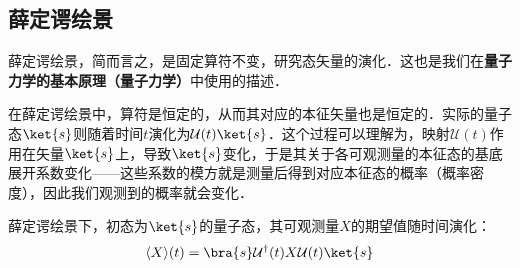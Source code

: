 

\subsection{薛定谔绘景}

薛定谔绘景，简而言之，是固定算符不变，研究态矢量的演化．这也是我们在\textbf{量子力学的基本原理（量子力学）}中使用的描述．

在薛定谔绘景中，算符是恒定的，从而其对应的本征矢量也是恒定的．实际的量子态$\ket{s}$则随着时间$t$演化为$\mathcal{U}(t)\ket{s}$．这个过程可以理解为，映射$\mathcal{U}(t)$作用在矢量$\ket{s}$上，导致$\ket{s}$变化，于是其关于各可观测量的本征态的基底展开系数变化——这些系数的模方就是测量后得到对应本征态的概率（概率密度），因此我们观测到的概率就会变化．


薛定谔绘景下，初态为$\ket{s}$的量子态，其可观测量$X$的期望值随时间演化：
\begin{equation}
\langle X \rangle(t) = \bra{s}\mathcal{U}^\dagger(t)X\mathcal{U}(t)\ket{s}
\end{equation}

